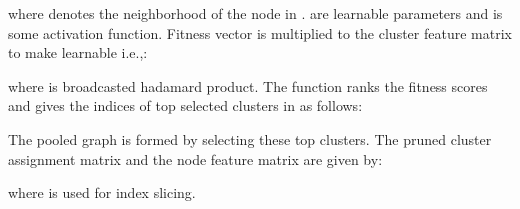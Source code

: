 \documentclass[letterpaper]{article} \usepackage{aaai20}  \usepackage{times}  \usepackage{helvet} \usepackage{courier}  \usepackage[hyphens]{url}  \usepackage{graphicx} \urlstyle{rm} \def\UrlFont{\rm}  \usepackage{graphicx}  \frenchspacing  \setlength{\pdfpagewidth}{8.5in}  \setlength{\pdfpageheight}{11in}
\begin{document}
where  denotes the neighborhood of the  node in .  are learnable parameters and  is some activation function. Fitness vector  is multiplied to the cluster feature matrix  to make  learnable i.e.,:

where  is broadcasted hadamard product. The function  ranks the fitness scores and gives the indices  of top  selected clusters in  as follows:

The pooled graph  is formed by selecting these top  clusters. The pruned cluster assignment matrix  and the node feature matrix  are given by:

where  is used for index slicing.






\begin{table*}[tbh]\
	\centering
	\caption{\label{tab:comparison} Comparison of ASAP with previous global and hierarchical pooling. Average accuracy and standard deviation is reported for 20 random seeds. We observe that ASAP consistently outperforms all the baselines on all the datasets. Please refer to Sec. \ref{sec:results} for more details.}
\end{table*}
\end{document}
